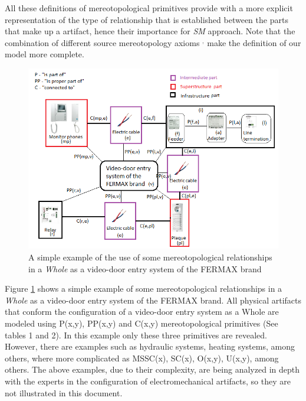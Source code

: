 \documentclass[runningheads,a4paper]{llncs}
\begin{document}
All these definitions of mereotopological primitives provide with a more explicit representation of the type of relationship that is established between the parts that make up a artifact, hence their importance for \emph{SM} approach. Note that the combination of different source mereotopology axioms  \cite{smith1996mereotopology} $^,$ \cite{varzi1996parts} make the definition of our model more complete.
\begin{figure}[h]
\centering
\includegraphics[scale=0.62]{TP1.png}
\caption{A simple example of the use of some mereotopological relationships in a \emph{Whole} as a video-door entry system of the FERMAX brand}\label{TP1}
\end{figure}

Figure \ref{TP1} shows a simple example of some mereotopological relationships in a \emph{Whole} as a video-door entry system of the FERMAX brand. All physical artifacts that conform the configuration of a video-door entry system as a Whole are modeled using P(x,y), PP(x,y) and C(x,y) mereotopological primitives (See tables 1 and 2). In this example only these three primitives are revealed. However, there are examples such as hydraulic systems, heating systems, among others, where more complicated as MSSC(x), SC(x), O(x,y), U(x,y), among others. The above examples, due to their complexity, are being analyzed in depth with the experts in the configuration of electromechanical artifacts, so they are not illustrated in this document.
\end{document}
